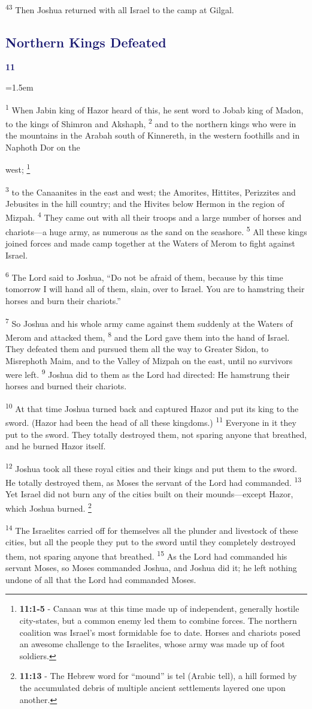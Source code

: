 \documentclass[12pt,twoside]{article}
\newcommand{\vs}[1]{\textsuperscript{#1}}
\newcommand{\vnote}[2]{%
  \begingroup
  \renewcommand\thefootnote{}%
  \footnote{\scriptsize \textbf{}#2}%
  \addtocounter{footnote}{-1}%
  \endgroup
}
\newcommand{\chapterWithBigIndent}[2]{%
  \noindent
  \begin{minipage}[t]{1cm}
    \vspace{-0.4\baselineskip}
    {\textcolor{MidnightBlue}{\fontsize{40pt}{48pt}\selectfont \textbf{#1}}}
  \end{minipage}%
  \hspace{0.9cm}%
  \begin{minipage}[t]{\dimexpr\linewidth - 1.5cm - 0.3cm\relax}
    \hangindent=1.5em
    \hangafter=3
    #2
    \vspace{0.05cm}
  \end{minipage}
}
\begin{document}
\vs{43} Then Joshua returned with all Israel to the camp at Gilgal.

\subsection*{\textcolor{MidnightBlue}{\textbf{Northern Kings Defeated}}}

\chapterWithBigIndent{11}{
  \vs{1} When Jabin king of Hazor heard of this, he sent word to Jobab king of Madon, to the kings of Shimron and Akshaph,
  \vs{2} and to the northern kings who were in the mountains in the Arabah south of Kinnereth, in the western foothills and in Naphoth Dor on the
}
\noindent west;\vnote{1}{\textbf{11:1-5} - Canaan was at this time made up of independent, generally hostile city-states, but a common enemy led them to combine forces. The northern coalition was Israel’s most formidable foe to date. Horses and chariots posed an awesome
challenge to the Israelites, whose army was made up of foot soldiers.}
\vs{3} to the Canaanites in the east and west; the Amorites, Hittites, Perizzites and Jebusites in the hill country; and the Hivites below Hermon in the region of Mizpah.
\vs{4} They came out with all their troops and a large number of horses and chariots---a huge army, as numerous as the sand on the seashore.
\vs{5} All these kings joined forces and made camp together at the Waters of Merom to fight against Israel.

\vs{6} The Lord said to Joshua, ``Do not be afraid of them, because by this time tomorrow I will hand all of them, slain, over to Israel. You are to hamstring their horses and burn their chariots.''

\vs{7} So Joshua and his whole army came against them suddenly at the Waters of Merom and attacked them,
\vs{8} and the Lord gave them into the hand of Israel. They defeated them and pursued them all the way to Greater Sidon, to Misrephoth Maim, and to the Valley of Mizpah on the east, until no survivors were left.
\vs{9} Joshua did to them as the Lord had directed: He hamstrung their horses and burned their chariots.

\vs{10} At that time Joshua turned back and captured Hazor and put its king to the sword. (Hazor had been the head of all these kingdoms.)
\vs{11} Everyone in it they put to the sword. They totally destroyed them, not sparing anyone that breathed, and he burned Hazor itself.

\vs{12} Joshua took all these royal cities and their kings and put them to the sword. He totally destroyed them, as Moses the servant of the Lord had commanded.
\vs{13} Yet Israel did not burn any of the cities built on their mounds---except Hazor, which Joshua burned.\vnote{13}{\textbf{11:13} - The Hebrew word for “mound” is tel (Arabic tell), a hill formed by the accumulated debris of multiple ancient settlements layered one upon another.}
\vs{14} The Israelites carried off for themselves all the plunder and livestock of these cities, but all the people they put to the sword until they completely destroyed them, not sparing anyone that breathed.
\vs{15} As the Lord had commanded his servant Moses, so Moses commanded Joshua, and Joshua did it; he left nothing undone of all that the Lord had commanded Moses.
\end{document}
